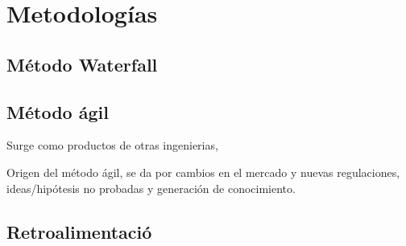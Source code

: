 \part{Metodolog\'ias}

\chapter{M\'etodo Waterfall}


\chapter{M\'etodo \'agil}
Surge como productos de otras ingenierias, 

Origen del m\'etodo \'agil, se da por cambios en el mercado y nuevas regulaciones, ideas/hip\'otesis no probadas y 
generaci\'on de conocimiento.


\chapter{Retroalimentaci\'o}


